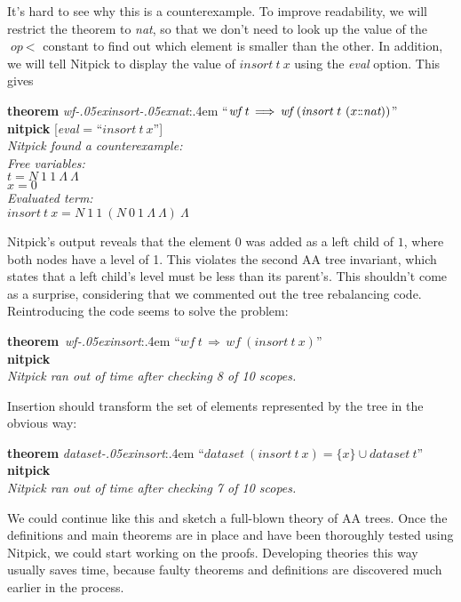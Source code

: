 \documentclass[a4paper,12pt]{article}
\def\Colon{\mathord{:\mkern-1.5mu:}}
\renewcommand\_{\hbox{\textunderscore\kern-.05ex}}
\begin{document}
It's hard to see why this is a counterexample. To improve readability, we will
restrict the theorem to \textit{nat}, so that we don't need to look up the value
of the $\textit{op}~{<}$ constant to find out which element is smaller than the
other. In addition, we will tell Nitpick to display the value of
$\textit{insort}~t~x$ using the \textit{eval} option. This gives

\prew
\textbf{theorem} \textit{wf\_insort\_nat\/}:\kern.4em ``$\textit{wf}~t\,\Longrightarrow\, \textit{wf}~(\textit{insort}~t~(x\Colon\textit{nat}))$'' \\
\textbf{nitpick} [\textit{eval} = ``$\textit{insort}~t~x$''] \\[2\smallskipamount]
\slshape Nitpick found a counterexample: \\[2\smallskipamount]
\hbox{}\qquad Free variables: \nopagebreak \\
\hbox{}\qquad\qquad $t = N~1~1~\Lambda~\Lambda$ \\
\hbox{}\qquad\qquad $x = 0$ \\
\hbox{}\qquad Evaluated term: \\
\hbox{}\qquad\qquad $\textit{insort}~t~x = N~1~1~(N~0~1~\Lambda~\Lambda)~\Lambda$
\postw

Nitpick's output reveals that the element $0$ was added as a left child of $1$,
where both nodes have a level of 1. This violates the second AA tree invariant,
which states that a left child's level must be less than its parent's. This
shouldn't come as a surprise, considering that we commented out the tree
rebalancing code. Reintroducing the code seems to solve the problem:

\prew
\textbf{theorem}~\textit{wf\_insort\/}:\kern.4em ``$\textit{wf}~t\,\Longrightarrow\, \textit{wf}~(\textit{insort}~t~x)$'' \\
\textbf{nitpick} \\[2\smallskipamount]
{\slshape Nitpick ran out of time after checking 8 of 10 scopes.}
\postw

Insertion should transform the set of elements represented by the tree in the
obvious way:

\prew
\textbf{theorem} \textit{dataset\_insort\/}:\kern.4em
``$\textit{dataset}~(\textit{insort}~t~x) = \{x\} \cup \textit{dataset}~t$'' \\
\textbf{nitpick} \\[2\smallskipamount]
{\slshape Nitpick ran out of time after checking 7 of 10 scopes.}
\postw

We could continue like this and sketch a full-blown theory of AA trees. Once the
definitions and main theorems are in place and have been thoroughly tested using
Nitpick, we could start working on the proofs. Developing theories this way
usually saves time, because faulty theorems and definitions are discovered much
earlier in the process.
\end{document}

